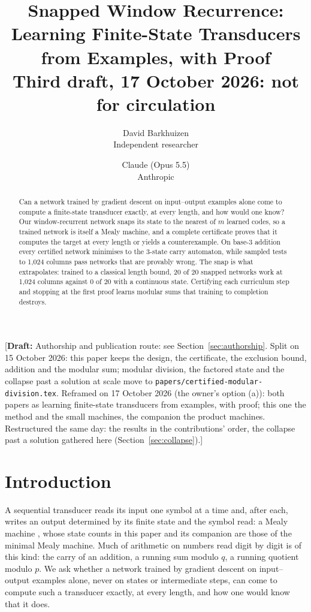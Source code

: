 \documentclass[11pt]{article}
\title{Snapped Window Recurrence:\\Learning Finite-State Transducers from Examples, with Proof\\[0.5em]
\large Third draft, 17 October 2026: not for circulation}
\author{
  David Barkhuizen\\
  Independent researcher
  \and
  Claude (Opus 5.5)\\
  Anthropic
}
\date{}
\newcommand{\draftnote}[1]{\textcolor{red!70!black}{[\textbf{Draft:} #1]}}
\begin{document}
\maketitle

\draftnote{Authorship and publication route: see Section~\ref{sec:authorship}. Split on 15 October
2026: this paper keeps the design, the certificate, the exclusion bound, addition and the modular
sum; modular division, the factored state and the collapse past a solution at scale move to
\texttt{papers/certified-modular-division.tex}. Reframed on 17 October 2026 (the owner's option (a)): both
papers as learning finite-state transducers from examples, with proof; this one the method and the
small machines, the companion the product machines. Restructured the same day: the results in the contributions' order, the
collapse past a solution gathered here (Section~\ref{sec:collapse}).}

\begin{abstract}
Can a network trained by gradient descent on input--output examples alone come to compute a
finite-state transducer exactly, at every length, and how would one know? Our window-recurrent
network snaps its state to the nearest of $m$ learned codes, so a trained network is itself a Mealy
machine, and a complete certificate proves that it computes the target at every length or yields a
counterexample. On base-3 addition every certified network minimises to the 3-state carry
automaton, while sampled tests to 1{,}024 columns pass networks that are provably wrong. The snap is
what extrapolates: trained to a classical length bound, 20 of 20 snapped networks work at 1{,}024
columns against 0 of 20 with a continuous state. Certifying each curriculum step and stopping at the
first proof learns modular sums that training to completion destroys.
\end{abstract}

\section{Introduction}

A sequential transducer reads its input one symbol at a time and, after each, writes an output
determined by its finite state and the symbol read: a Mealy machine \citep{mealy-1955-synthesizing},
whose state counts in this paper and its companion are those of the minimal Mealy machine. Much of arithmetic on numbers read
digit by digit is of this kind: the carry of an addition, a running sum modulo $q$, a running
quotient modulo $p$. We ask whether a network trained by gradient descent on input--output examples
alone, never on states or intermediate steps, can come to compute such a transducer exactly, at
every length, and how one would know that it does.
\end{document}
